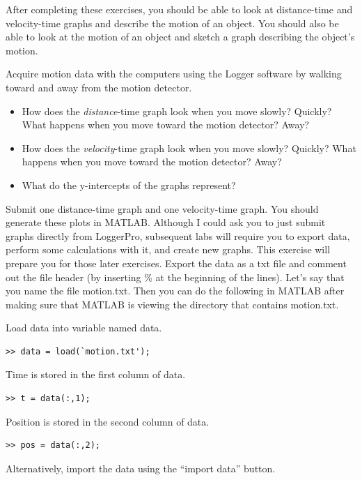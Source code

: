 \documentclass[11pt,letterpaper]{article}
\newcounter{question}[section]
\begin{document}
After completing these exercises, you should be able to look at distance-time and velocity-time graphs and describe the motion of an object.  You should also be able to look at the motion of an object and sketch a graph describing the object's motion.  

\question{} Acquire motion data with the computers using the Logger software by walking toward and away from the motion detector.

\begin{itemize}
\item How does the \textit{distance}-time graph look when you move slowly?  Quickly?
What happens when you move toward the motion detector?  Away? \vspace{3cm}  
\item How does the \textit{velocity}-time graph look when you move slowly?  Quickly?
What happens when you move toward the motion detector?  Away?  \vspace{3cm}
\item What do the y-intercepts of the graphs represent? \vspace{3cm}
\end{itemize}

Submit one distance-time graph and one velocity-time graph. You should generate these plots in MATLAB. Although I could ask you to just submit graphs directly from LoggerPro, subsequent labs will require you to export data, perform some calculations with it, and create new graphs. This exercise will prepare you for those later exercises. Export the data as a txt file and comment out the file header (by inserting \% at the beginning of the lines). Let's say that you name the file motion.txt. Then you can do the following in MATLAB after making sure that MATLAB is viewing the directory that contains motion.txt.

Load data into variable named data.
\begin{verbatim}>> data = load(`motion.txt');\end{verbatim}

Time is stored in the first column of data.
\begin{verbatim}>> t = data(:,1);\end{verbatim}

Position is stored in the second column of data.
\begin{verbatim}>> pos = data(:,2);\end{verbatim}

Alternatively, import the data using the ``import data'' button.
\end{document}
